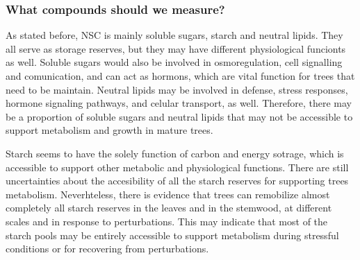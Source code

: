 \documentclass{article}
\begin{document}








\subsubsection{What compounds should we measure?}

As stated before, NSC is mainly soluble sugars, starch and neutral lipids.
They all serve as storage reserves, but they may have different physiological funcionts as well. 
Soluble sugars would also be involved in osmoregulation, cell signalling and comunication, and can act as hormons, which are vital function for trees that need to be maintain. 
Neutral lipids may be involved in defense, stress responses, hormone signaling pathways, and celular transport, as well. 
Therefore, there may be a proportion of soluble sugars and neutral lipids that may not be accessible to support metabolism and growth in mature trees.

Starch seems to have the solely function of carbon and energy sotrage, which is accessible to support other metabolic and physiological functions. 
There are still uncertainties about the accesibility of all the starch reserves for supporting trees metabolism. 
Neverhteless, there is evidence that trees can remobilize almost completely all starch reserves in the leaves and in the stemwood, at different scales and in response to perturbations. 
This may indicate that most of the starch pools may be entirely accessible to support metabolism during stressful conditions or for recovering from perturbations. 
\end{document}
